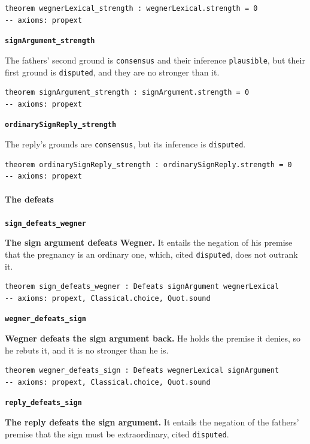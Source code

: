 \documentclass[11pt]{article}
\begin{document}
{\small\begin{verbatim}
theorem wegnerLexical_strength : wegnerLexical.strength = 0
-- axioms: propext
\end{verbatim}}
\par\medskip\noindent\textbf{\texttt{sign\allowbreak{}Argument\_\allowbreak{}strength}}\par\nobreak\noindent
The fathers' second ground is \texttt{consensus} and their inference \texttt{plausible}, but their first ground is \texttt{disputed}, and they are no stronger than it.

{\small\begin{verbatim}
theorem signArgument_strength : signArgument.strength = 0
-- axioms: propext
\end{verbatim}}
\par\medskip\noindent\textbf{\texttt{ordinary\allowbreak{}Sign\allowbreak{}Reply\_\allowbreak{}strength}}\par\nobreak\noindent
The reply's grounds are \texttt{consensus}, but its inference is \texttt{disputed}.

{\small\begin{verbatim}
theorem ordinarySignReply_strength : ordinarySignReply.strength = 0
-- axioms: propext
\end{verbatim}}
\paragraph*{The defeats}
\leavevmode\par
\par\medskip\noindent\textbf{\texttt{sign\_\allowbreak{}defeats\_\allowbreak{}wegner}}\par\nobreak\noindent
\textbf{The sign argument defeats Wegner.} It entails the negation of his premise that the pregnancy is an ordinary one, which, cited \texttt{disputed}, does not outrank it.

{\small\begin{verbatim}
theorem sign_defeats_wegner : Defeats signArgument wegnerLexical
-- axioms: propext, Classical.choice, Quot.sound
\end{verbatim}}
\par\medskip\noindent\textbf{\texttt{wegner\_\allowbreak{}defeats\_\allowbreak{}sign}}\par\nobreak\noindent
\textbf{Wegner defeats the sign argument back.} He holds the premise it denies, so he rebuts it, and it is no stronger than he is.

{\small\begin{verbatim}
theorem wegner_defeats_sign : Defeats wegnerLexical signArgument
-- axioms: propext, Classical.choice, Quot.sound
\end{verbatim}}
\par\medskip\noindent\textbf{\texttt{reply\_\allowbreak{}defeats\_\allowbreak{}sign}}\par\nobreak\noindent
\textbf{The reply defeats the sign argument.} It entails the negation of the fathers' premise that the sign must be extraordinary, cited \texttt{disputed}.
\end{document}
